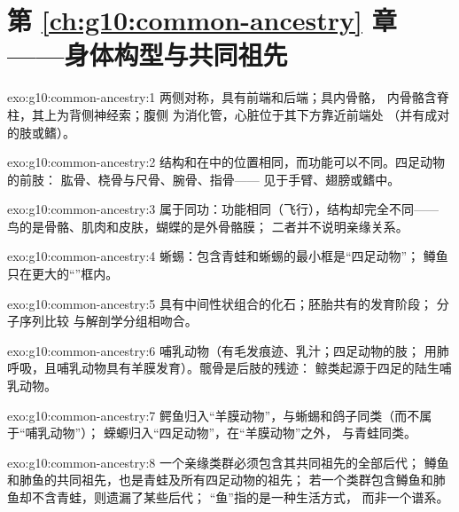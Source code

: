 \section*{第 \ref{ch:g10:common-ancestry} 章——身体构型与共同祖先}

\begin{solution}{exo:g10:common-ancestry:1}
两侧对称，具有前端和后端；具内骨骼，
内骨骼含脊柱，其上为背侧神经索；腹侧
为消化管，心脏位于其下方靠近前端处
（并有成对的肢或鳍）。
\end{solution}

\begin{solution}{exo:g10:common-ancestry:2}
结构和在中的位置相同，而功能可以不同。四足动物的前肢：
肱骨、桡骨与尺骨、腕骨、指骨——
见于手臂、翅膀或鳍中。
\end{solution}

\begin{solution}{exo:g10:common-ancestry:3}
属于同功：功能相同（飞行），结构却完全不同——
鸟的是骨骼、肌肉和皮肤，蝴蝶的是外骨骼膜；
二者并不说明亲缘关系。
\end{solution}

\begin{solution}{exo:g10:common-ancestry:4}
蜥蜴：包含青蛙和蜥蜴的最小框是“四足动物”；
鳟鱼只在更大的“”框内。
\end{solution}

\begin{solution}{exo:g10:common-ancestry:5}
具有中间性状组合的化石；胚胎共有的发育阶段；
分子序列比较
与解剖学分组相吻合。
\end{solution}

\begin{solution}{exo:g10:common-ancestry:6}
哺乳动物（有毛发痕迹、乳汁；四足动物的肢；
用肺呼吸，且哺乳动物具有羊膜发育）。髋骨是后肢的残迹：
鲸类起源于四足的陆生哺乳动物。
\end{solution}

\begin{solution}{exo:g10:common-ancestry:7}
鳄鱼归入“羊膜动物”，与蜥蜴和鸽子同类（而不属于“哺乳动物”）；
蝾螈归入“四足动物”，在“羊膜动物”之外，
与青蛙同类。
\end{solution}

\begin{solution}{exo:g10:common-ancestry:8}
一个亲缘类群必须包含其共同祖先的全部后代；
鳟鱼和肺鱼的共同祖先，也是青蛙及所有四足动物的祖先；
若一个类群包含鳟鱼和肺鱼却不含青蛙，则遗漏了某些后代；
“鱼”指的是一种生活方式，
而非一个谱系。
\end{solution}

